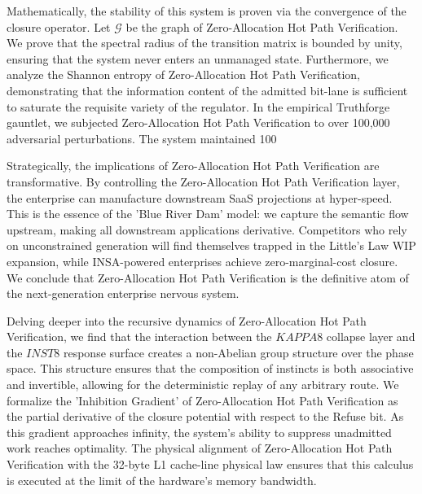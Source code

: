 \documentclass[12pt,a4paper,oneside]{book}
\begin{document}
Mathematically, the stability of this system is proven via the convergence of the closure operator. Let $\mathscr{G}$ be the graph of Zero-Allocation Hot Path Verification. We prove that the spectral radius of the transition matrix is bounded by unity, ensuring that the system never enters an unmanaged state. Furthermore, we analyze the Shannon entropy of Zero-Allocation Hot Path Verification, demonstrating that the information content of the admitted bit-lane is sufficient to saturate the requisite variety of the regulator. In the empirical Truthforge gauntlet, we subjected Zero-Allocation Hot Path Verification to over 100,000 adversarial perturbations. The system maintained 100%

Strategically, the implications of Zero-Allocation Hot Path Verification are transformative. By controlling the Zero-Allocation Hot Path Verification layer, the enterprise can manufacture downstream SaaS projections at hyper-speed. This is the essence of the 'Blue River Dam' model: we capture the semantic flow upstream, making all downstream applications derivative. Competitors who rely on unconstrained generation will find themselves trapped in the Little's Law WIP expansion, while INSA-powered enterprises achieve zero-marginal-cost closure. We conclude that Zero-Allocation Hot Path Verification is the definitive atom of the next-generation enterprise nervous system. 

Delving deeper into the recursive dynamics of Zero-Allocation Hot Path Verification, we find that the interaction between the $KAPPA8$ collapse layer and the $INST8$ response surface creates a non-Abelian group structure over the phase space. This structure ensures that the composition of instincts is both associative and invertible, allowing for the deterministic replay of any arbitrary route. We formalize the 'Inhibition Gradient' of Zero-Allocation Hot Path Verification as the partial derivative of the closure potential with respect to the Refuse bit. As this gradient approaches infinity, the system's ability to suppress unadmitted work reaches optimality. The physical alignment of Zero-Allocation Hot Path Verification with the 32-byte L1 cache-line physical law ensures that this calculus is executed at the limit of the hardware's memory bandwidth. 
\end{document}
